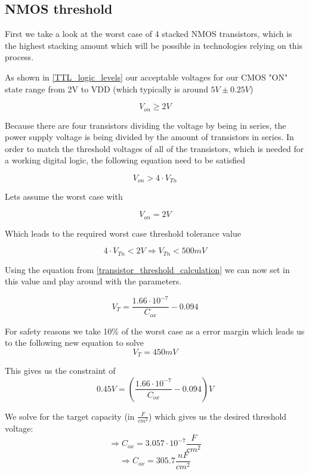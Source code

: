 \subsection{NMOS threshold}\label{nmos_gate_dimensioning}
First we take a look at the worst case of 4 stacked NMOS transistors, which is the highest stacking amount which will be possible in technologies relying on this process.


As shown in  \autoref{TTL_logic_levels} our acceptable voltages for our CMOS "ON" state range from 2V to VDD (which typically is around $5V\pm0.25V$)

\begin{equation}
V_{on} \geq 2V
\end{equation}

Because there are four transistors dividing the voltage by being in series, the power supply voltage is being divided by the amount of transistors in series.
In order to match the threshold voltages of all of the transistors, which is needed for a working digital logic, the following equation need to be satisfied

\begin{equation}
V_{on} > 4 \cdot V_{Tn}
\end{equation}

Lets assume the worst case with

\begin{equation}
V_{on} = 2V
\end{equation}

Which leads to the required worst case threshold tolerance value

\begin{equation}
4 \cdot V_{Tn} < 2V
\Rightarrow
V_{Tn} < 500mV
\end{equation}
 
Using the equation from \autoref{transistor_threshold_calculation} we can now set in this value and play around with the parameters.
  

 
 \begin{equation}
V_T= \frac{1.66 \cdot 10^{-7}}{C_{ox}}-0.094
\end{equation}

For safety reasons we take 10\% of the worst case as a error margin which leads us to the following new equation to solve
 \begin{equation}
V_T = 450mV
\end{equation}

This gives us the constraint of
\begin{equation}
0.45 V = \left( \frac{1.66 \cdot 10^{-7}}{C_{ox}}-0.094 \right) V
\end{equation}

We solve for the target capacity (in $\frac{F}{cm^2}$) which gives us the desired threshold voltage:
\begin{equation}
\Rightarrow
C_{ox}
=
3.057 \cdot {10}^{-7} \frac{F}{cm^2}
\end{equation}
\begin{equation}
\Rightarrow
C_{ox}
=
305.7 \frac{nF}{cm^2}
\end{equation}
